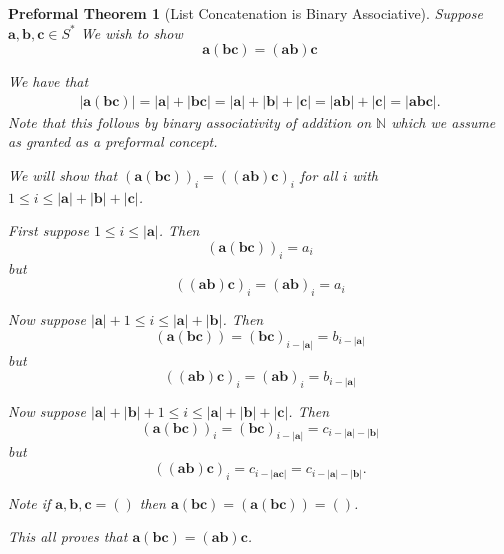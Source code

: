 \documentclass[oneside, 12pt]{book}
\theoremstyle{break}
\newtheorem{preformal definition}[definition]{Preformal Definition}
\newtheorem{preformal theorem}[theorem]{Preformal Theorem}
\newcommand{\bv}[1]{\boldsymbol{#1}}
\newcommand{\N}[0]{\mathbb{N}}
\newcommand{\norm}[1]{\left|#1\right|}
\begin{document}
			\begin{preformal theorem}[List Concatenation is Binary Associative]
				Suppose $\bv{a}, \bv{b}, \bv{c} \in S^*$
				We wish to show
				\begin{equation*}
					\bv{a}(\bv{b}\bv{c}) = (\bv{a}\bv{b})\bv{c}
				\end{equation*}
				
				We have that
				\begin{align*}
					\norm{\bv{a}(\bv{b}\bv{c})} = \norm{\bv{a}} + \norm{\bv{b}\bv{c}} = \norm{\bv{a}} + \norm{\bv{b}} + \norm{\bv{c}} = \norm{\bv{a}\bv{b}} + \norm{\bv{c}} = \norm{\bv{a}\bv{b}\bv{c}}.
				\end{align*}
				Note that this follows by binary associativity of addition on $\N$ which we assume as granted as a preformal concept.
				
				We will show that $(\bv{a}(\bv{b}\bv{c}))_i = ((\bv{a}\bv{b})\bv{c})_i$ for all $i$ with $1 \le i \le \norm{\bv{a}} + \norm{\bv{b}} + \norm{\bv{c}}$.
		
				First suppose $1 \le i \le \norm{\bv{a}}$.
				Then 
				\begin{equation*}
					(\bv{a}(\bv{b}\bv{c}))_i = a_i
				\end{equation*}
				but 
				\begin{equation*}
					((\bv{a}\bv{b})\bv{c})_i = (\bv{a}\bv{b})_i = a_i
				\end{equation*}
				
				Now suppose $\norm{\bv{a}} + 1 \le i \le \norm{\bv{a}} + \norm{\bv{b}}$.
				Then 
				\begin{equation*}
					(\bv{a}(\bv{b}\bv{c})) = (\bv{b}\bv{c})_{i-\norm{\bv{a}}} = b_{i-\norm{\bv{a}}}
				\end{equation*}
				but
				\begin{equation*}
					((\bv{a}\bv{b})\bv{c})_i = (\bv{a}\bv{b})_i = b_{i-\norm{\bv{a}}}
				\end{equation*}
				
				Now suppose $\norm{\bv{a}} + \norm{\bv{b}}+1 \le i \le \norm{\bv{a}} + \norm{\bv{b}} + \norm{\bv{c}}$.
				Then
				\begin{equation*}
					(\bv{a}(\bv{b}\bv{c}))_i = (\bv{b}\bv{c})_{i-\norm{\bv{a}}} = c_{i-\norm{\bv{a}} - \norm{\bv{b}}}
				\end{equation*}
				but
				\begin{equation*}
					((\bv{a}\bv{b})\bv{c})_i = c_{i-\norm{\bv{a}\bv{c}}} = c_{i-\norm{\bv{a}} - \norm{\bv{b}}}.
				\end{equation*}
				
				Note if $\bv{a}, \bv{b}, \bv{c} = ()$ then $\bv{a}(\bv{b}\bv{c}) = (\bv{a}(\bv{b}\bv{c})) = ()$.
				
				This all proves that $\bv{a}(\bv{b}\bv{c}) = (\bv{a}\bv{b})\bv{c}$.
			\end{preformal theorem}
	
\end{document}

